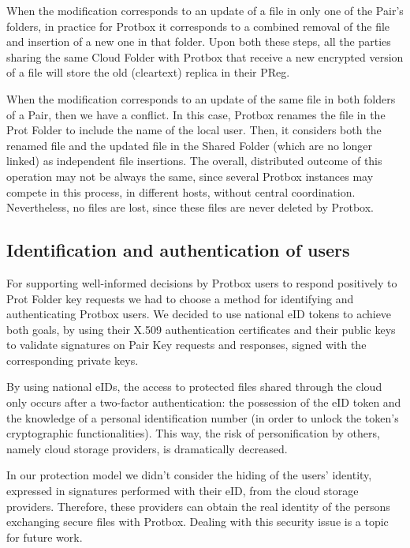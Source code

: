 \documentclass[english]{lni}
\newcommand\protbox{Protbox}
\newcommand\ProtF{Prot Folder}
\newcommand\SharedF{Shared Folder}
\newcommand\CloudF{Cloud Folder}
\newcommand\PairKey{Pair Key}
\begin{document}
When the modification corresponds to an update of a file in only one
of the Pair's folders, in practice for {\protbox} it corresponds to
a combined removal of the file and insertion of a new one in that
folder. Upon both these steps, all the parties sharing the same
{\CloudF} with {\protbox} that receive a new encrypted version of
a file will store the old (cleartext) replica in their PReg.

When the modification corresponds to an update of the same file in
both folders of a Pair, then we have a conflict. In this case,
{\protbox} renames the file in the {\ProtF} to include the name 
of the local user. Then, it considers both the renamed
file and the updated file in the {\SharedF} (which are no longer
linked) as independent file insertions. The overall, distributed
outcome of this operation may not be always the same, since several
{\protbox} instances may compete in this process, in different
hosts, without central coordination. Nevertheless, no files are lost,
since these files are never deleted by {\protbox}.

\subsection{Identification and authentication of users}

For supporting well-informed decisions by {\protbox} users to
respond positively to {\ProtF} key requests we had to choose a
method for identifying and authenticating {\protbox} users. We
decided to use national eID tokens to achieve both goals, by using
their X.509 authentication certificates and their public keys to
validate signatures on {\PairKey} requests and responses, signed with
the corresponding private keys. 

By using national eIDs, the access to protected files shared through
the cloud only occurs after a two-factor authentication: the
possession of the eID token and the knowledge of a personal
identification number (in order to unlock the token's cryptographic
functionalities). This way, the risk of personification by others,
namely cloud storage providers, is dramatically decreased.

In our protection model we didn't consider the hiding of the users'
identity, expressed in signatures performed with their eID, from the
cloud storage providers. Therefore, these providers can obtain the
real identity of the persons exchanging secure files with
{\protbox}. Dealing with this security issue is a topic for future work.
\end{document}
